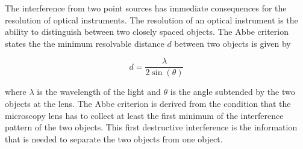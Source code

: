 \documentclass[
  a4paper,
]{book}
\begin{document}
The interference from two point sources has immediate consequences for
the resolution of optical instruments. The resolution of an optical
instrument is the ability to distinguish between two closely spaced
objects. The Abbe criterion states the the minimum resolvable distance
\(d\) between two objects is given by

\[
d = \frac{\lambda}{2 \sin(\theta)}
\]

where \(\lambda\) is the wavelength of the light and \(\theta\) is the
angle subtended by the two objects at the lens. The Abbe criterion is
derived from the condition that the microscopy lens has to collect at
least the first minimum of the interference pattern of the two objects.
This first destructive interference is the information that is needed to
separate the two objects from one object.
\end{document}
